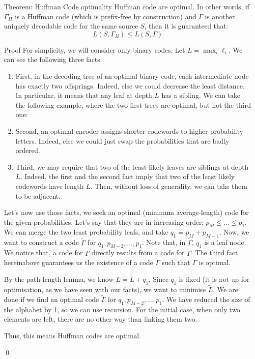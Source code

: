 \documentclass[a4paper]{article}
\begin{document}
\begin{parag}{Theorem: Huffman Code optimality}
    Huffman code are optimal. In other words, if $\Gamma_H$ is a Huffman code (which is prefix-free by construction) and $\Gamma$ is another uniquely decodable code for the same source $S$, then it is guaranteed that: 
    \[L\left(S, \Gamma_H\right) \leq L\left(S, \Gamma\right)\]

    \begin{subparag}{Proof}
        For simplicity, we will consider only binary codes. Let $L = \max_i \ell_i$. We can see the following three facts.

        \begin{enumerate}[left=0pt]
        \item First, in the decoding tree of an optimal binary code, each intermediate node has exactly two offsprings. Indeed, else we could decrease the least distance. In particular, it means that any leaf at depth $L$ has a sibling. We can take the following example, where the two first trees are optimal, but not the third one:

        \item Second, an optimal encoder assigns shorter codewords to higher probability letters. Indeed, else we could just swap the probabilities that are badly ordered.

    \item Third, we may require that two of the least-likely leaves are siblings at depth $L$. Indeed, the first and the second fact imply that two of the least likely codewords have length $L$. Then, without loss of generality, we can take them to be adjacent.        \end{enumerate}
        
        Let's now use those facts, we seek an optimal (minimum average-length) code for the given probabilities. Let's say that they are in increasing order: $p_M \leq \ldots \leq p_1$. We can merge the two least probability leafs, and take $q_1 = p_M + p_{M-1}$. Now, we want to construct a code $\widetilde{\Gamma}$ for $q_1, p_{M-2}, \ldots, p_1$. Note that, in $\widetilde{\Gamma}$, $q_1$ is a leaf node. We notice that, a code for $\Gamma$ directly results from a code for $\widetilde{\Gamma}$. The third fact hereinabove guarantees us the existence of a code $\widetilde{\Gamma}$ such that $\Gamma$ is optimal.

        By the path-length lemma, we know $L = \widetilde{L} + q_1$. Since $q_1$ is fixed (it is not up for optimisation, as we have seen with our facts), we want to minimise $\widetilde{L}$. We are done if we find an optimal code $\widetilde{\Gamma}$ for $q_1, p_{M-2}, \ldots, p_1$. We have reduced the size of the alphabet by 1, so we can use recursion. For the initial case, when only two elements are left, there are no other way than linking them two.

        Thus, this means Huffman codes are optimal.

        \qed
    \end{subparag}
\end{parag}
\end{document}

